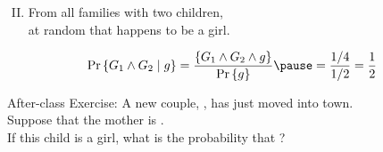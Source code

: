 \begin{frame}{}
  \centerline{}

  \vspace{0.60cm}
  \begin{enumerate}[(I)]
    \setcounter{enumi}{1}
    \item {} From all families with two children,  \\
      at random that happens to be a girl.
  \end{enumerate}

  \pause
  \vspace{0.50cm}
  \[
    \Pr\set{G_1 \land G_2 \mid g} = \frac{\set{G_1 \land G_2 \land g}}{\Pr\set{g}} \pause = \frac{1/4}{1/2} = \frac{1}{2}
  \]
\end{frame}

\begin{frame}{}
  \begin{exampleblock}{After-class Exercise:}
    A new couple, , has just moved into town. \\
    Suppose that the mother is . \\
    If this child is a girl, what is the probability that ?
  \end{exampleblock}

  \vspace{0.50cm}
\end{frame}
